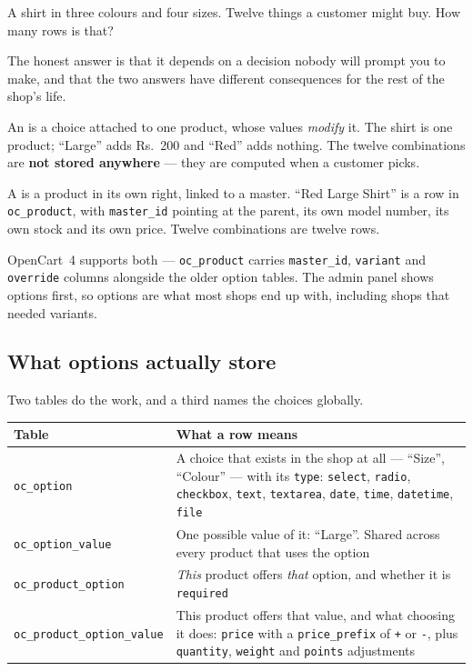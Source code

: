 A shirt in three colours and four sizes. Twelve things a customer might buy.
How many rows is that?

The honest answer is that it depends on a decision nobody will prompt you to
make, and that the two answers have different consequences for the rest of the
shop's life.

\begin{definitionbox}
An  is a choice attached to one product, whose values
\emph{modify} it. The shirt is one product; ``Large'' adds Rs.~200 and
``Red'' adds nothing. The twelve combinations are \textbf{not stored
anywhere} --- they are computed when a customer picks.

\smallskip
A  is a product in its own right, linked to a master. ``Red
Large Shirt'' is a row in \texttt{oc\_product}, with
\texttt{master\_id} pointing at the parent, its own model number, its own
stock and its own price. Twelve combinations are twelve rows.

\smallskip
OpenCart~4 supports both --- \texttt{oc\_product} carries
\texttt{master\_id}, \texttt{variant} and \texttt{override} columns alongside
the older option tables. The admin panel shows options first, so options are
what most shops end up with, including shops that needed variants.
\end{definitionbox}

\subsection{What options actually store}

Two tables do the work, and a third names the choices globally.

\begin{longtable}{@{}L{5.4cm}L{9.6cm}@{}}
\toprule
{}
\textbf{Table} & \textbf{What a row means} \\
\midrule
\endhead
\texttt{oc\_option} & A choice that exists in the shop at all --- ``Size'',
``Colour'' --- with its \texttt{type}: \texttt{select}, \texttt{radio},
\texttt{checkbox}, \texttt{text}, \texttt{textarea}, \texttt{date},
\texttt{time}, \texttt{datetime}, \texttt{file} \\
\texttt{oc\_option\_value} & One possible value of it: ``Large''. Shared
across every product that uses the option \\
\texttt{oc\_product\_option} & \emph{This} product offers \emph{that} option,
and whether it is \texttt{required} \\
\texttt{oc\_product\_option\_value} & This product offers that value, and
what choosing it does: \texttt{price} with a \texttt{price\_prefix} of
\texttt{+} or \texttt{-}, plus \texttt{quantity}, \texttt{weight} and
\texttt{points} adjustments \\
\bottomrule
\end{longtable}

